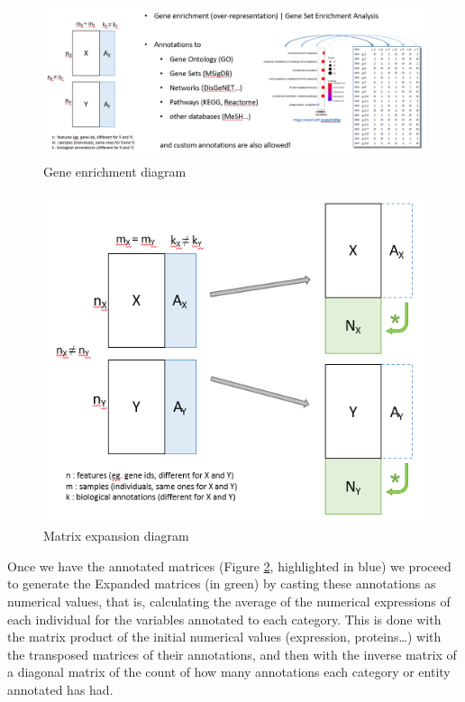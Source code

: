 \documentclass[a4paper, nobind]{templates/ociamthesis}
\begin{document}
\begin{figure}

{\centering \includegraphics[width=0.95\linewidth]{figures/chapter3/3-3_gene_enrichment_diagram} 

}

\caption{Gene enrichment diagram}\label{fig:fig3-3}
\end{figure}

\begin{figure}

{\centering \includegraphics[width=0.95\linewidth]{figures/chapter3/3-4_matrix_expansion_diagram} 

}

\caption{Matrix expansion diagram}\label{fig:fig3-4}
\end{figure}

Once we have the annotated matrices (Figure \ref{fig:fig3-4}, highlighted in blue) we proceed to generate the Expanded matrices (in green) by casting these annotations as numerical values, that is, calculating the average of the numerical expressions of each individual for the variables annotated to each category. This is done with the matrix product of the initial numerical values (expression, proteins\ldots) with the transposed matrices of their annotations, and then with the inverse matrix of a diagonal matrix of the count of how many annotations each category or entity annotated has had.
\end{document}
